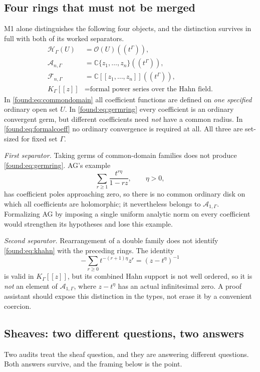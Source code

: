 \documentclass[11pt,letterpaper]{article}
\numberwithin{equation}{section}
\theoremstyle{definition}
\theoremstyle{remark}
\newcommand{\C}{\mathbb C}
\newcommand{\OO}{\mathcal O}
\newcommand{\HH}{\mathcal H}
\newcommand{\Ag}{\mathscr A}
\newcommand{\Fg}{\mathscr F}
\begin{document}
\subsection{Four rings that must not be merged}
\label{found:sub:fourrings}
M1 alone distinguishes the following four objects, and the distinction survives
in full with both of its worked separators.
\begin{align}
 \HH_\Gamma(U)&=\OO(U)((t^\Gamma)),\label{found:eq:commondomain}\\
 \Ag_{n,\Gamma}&=\C\{z_1,\ldots,z_n\}((t^\Gamma)),\label{found:eq:germring}\\
 \Fg_{n,\Gamma}&=\C[[z_1,\ldots,z_n]]((t^\Gamma)),\label{found:eq:formalcoeff}\\
 K_\Gamma[[z]]&=\text{formal power series over the Hahn field.}
 \label{found:eq:khahn}
\end{align}
In \eqref{found:eq:commondomain} all coefficient functions are defined on
\emph{one specified} ordinary open set $U$. In \eqref{found:eq:germring} every
coefficient is an ordinary convergent germ, but different coefficients need
\emph{not} have a common radius. In \eqref{found:eq:formalcoeff} no ordinary
convergence is required at all. All three are set-sized for fixed set $\Gamma$.

\emph{First separator.} Taking germs of common-domain families does not produce
\eqref{found:eq:germring}. AG's example
\[
 \sum_{r\ge1}\frac{t^{r\eta}}{1-rz},\qquad\eta>0,
\]
has coefficient poles approaching zero, so there is no common ordinary disk on
which all coefficients are holomorphic; it nevertheless belongs to
$\Ag_{1,\Gamma}$. Formalizing AG by imposing a single uniform analytic norm on
every coefficient would strengthen its hypotheses and lose this example.

\emph{Second separator.} Rearrangement of a double family does not identify
\eqref{found:eq:khahn} with the preceding rings. The identity
\[
 -\sum_{r\ge0}t^{-(r+1)\eta}z^r=(z-t^\eta)^{-1}
\]
is valid in $K_\Gamma[[z]]$, but its combined Hahn support is not well ordered,
so it is \emph{not} an element of $\Ag_{1,\Gamma}$, where $z-t^\eta$ has an
actual infinitesimal zero. A proof assistant should expose this distinction in
the types, not erase it by a convenient coercion.

\subsection{Sheaves: two different questions, two answers}
\label{found:sub:sheaves}
Two audits treat the sheaf question, and they are answering different questions.
Both answers survive, and the framing below is the point.
\end{document}
